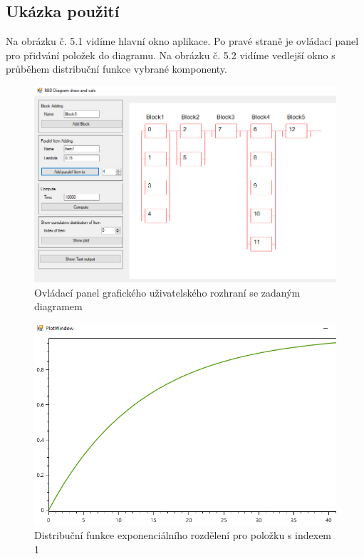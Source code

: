 \documentclass[FM,RP]{tulthesis}
\begin{document}
    \subsection*{Ukázka použití}
        Na obrázku č. 5.1 vidíme hlavní okno aplikace. Po pravé straně je ovládací panel pro přidvání položek do diagramu.
        Na obrázku č. 5.2 vidíme vedlejší okno s průběhem distribuční funkce vybrané komponenty.
    \begin{figure}[h]
        \centering
        \includegraphics[scale=0.70]{pic/gui.png}
        \caption{Ovládací panel grafického uživatelského rozhraní se zadaným diagramem} 
    \end{figure}
    \begin{figure}[h]
        \centering
        \includegraphics[scale=0.50]{pic/oxy.png}
        \caption{Distribuční funkce exponenciálního rozdělení pro položku s indexem 1} 
    \end{figure}
\end{document}
